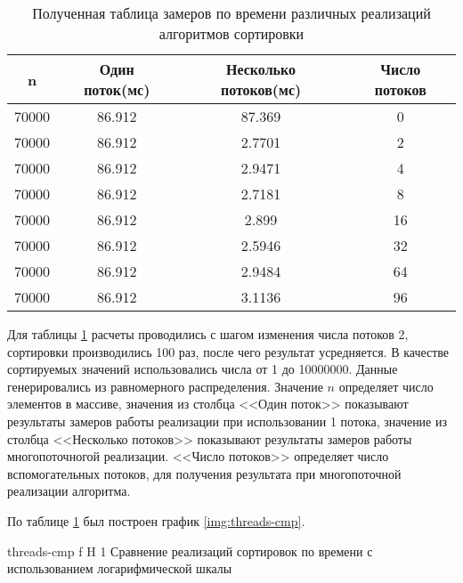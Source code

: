 \begin{table}[ht]
	\centering
	\caption{Полученная таблица замеров по времени различных реализаций алгоритмов сортировки}
	\begin{tabular}{|c|c|c|c|}
		\hline
		n     & Один поток(мс) & Несколько потоков(мс) & Число потоков \\ \hline
		70000 & 86.912                  & 87.369                                  & 0             \\ \hline
		70000 & 86.912                  & 2.7701                                  & 2             \\ \hline
		70000 & 86.912                  & 2.9471                                  & 4             \\ \hline
		70000 & 86.912                  & 2.7181                                  & 8             \\ \hline
		70000 & 86.912                  & 2.899                                   & 16            \\ \hline
		70000 & 86.912                  & 2.5946                                  & 32            \\ \hline
		70000 & 86.912                  & 2.9484                                  & 64            \\ \hline
		70000 & 86.912                  & 3.1136                                  & 96            \\ \hline
	\end{tabular}
	\label{t:timings}
\end{table}
Для таблицы \ref{t:timings} расчеты проводились с шагом изменения числа потоков 2, сортировки производились 100 раз, после чего результат усредняется. В качестве сортируемых значений использовались  числа от 1 до 10000000. Данные генерировались из равномерного распределения.
Значение $n$ определяет число элементов в массиве, значения из столбца <<Один поток>> показывают результаты замеров  работы реализации при использовании 1 потока, значение  из столбца <<Несколько потоков>> показывают результаты замеров работы многопоточногой реализации. <<Число потоков>> определяет число вспомогательных потоков, для получения результата при многопоточной реализации алгоритма.


По таблице \ref{t:timings} был построен график \ref{img:threads-cmp}. 

{threads-cmp} %
{f} %
{H} %
{1\textwidth} %
{Сравнение реализаций сортировок по времени с использованием логарифмической шкалы} %


